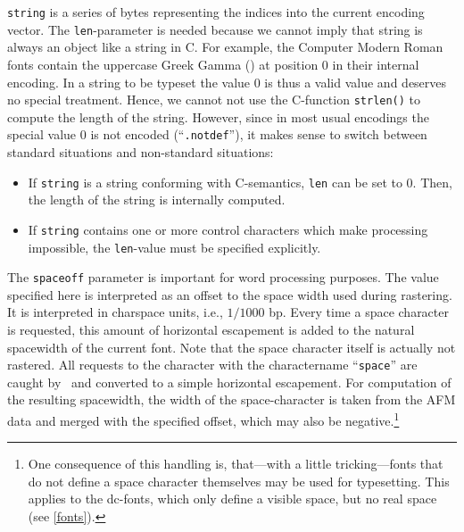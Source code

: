 \verb+string+ is a series of bytes representing the indices into the current
encoding vector. 
The \verb+len+-parameter is needed because we cannot imply that string
is always an object like a string in C. For example, the Computer
Modern Roman fonts contain the uppercase Greek Gamma () at
position 0 in their internal encoding. In a string to be typeset the
value 0 is thus a valid value and deserves no special
treatment. Hence, we cannot not use the C-function \verb+strlen()+ to
compute the length of the string. However, since in most usual encodings
the special value 0 is not encoded (``\verb+.notdef+''), it makes
sense to switch between 
standard situations and non-standard situations:
\begin{itemize}
\item If \verb+string+ is a string conforming with C-semantics,
  \verb+len+ can be set to 0. Then, the length of the string is
  internally computed.
\item If \verb+string+ contains one or more control characters which make
  processing impossible, the \verb+len+-value must be specified
  explicitly. 
\end{itemize}

The \verb+spaceoff+ parameter is important for word processing
purposes. The value specified here is interpreted as an offset to the
space width used during rastering. It is interpreted in charspace
units, i.e., $1/1000$ bp. Every time a space character is requested,
this amount of horizontal escapement is added to the natural
spacewidth of the current font. Note that the space character itself
is actually not rastered. All requests to the character with the
charactername ``\verb+space+'' are caught by \tonelib\ and converted
to a simple horizontal escapement. For computation of the resulting
spacewidth, the width of the space-character is taken from the
AFM data and merged with the specified offset, which may also be
negative.\footnote{One consequence of this handling is, that---with a
  little tricking---fonts that do not define a space character
  themselves may be used for typesetting. This applies to the
  dc-fonts, which only define a visible space, but no real space (see
  \ref{fonts}).}

